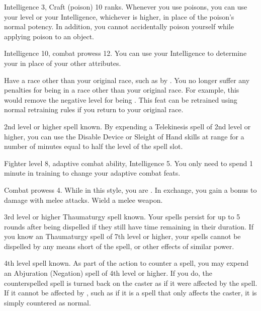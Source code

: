 \featpres Intelligence 3, Craft (poison) 10 ranks.
\featben Whenever you use poisons, you can use your level or your Intelligence, whichever is higher, in place of the poison's normal potency.
In addition, you cannot accidentally poison yourself while applying poison to an object.

\featpres Intelligence 10, combat prowess 12.
\featben You can use your Intelligence to determine your  in place of your other attributes.

\label{Racial Acclimation}
\featpres Have a race other than your original race, such as by .
\featben You no longer suffer any penalties for being in a race other than your original race.
For example, this would remove the negative level for being .
This feat can be retrained using normal retraining rules if you return to your original race.

\featpre 2nd level or higher  spell known.
\featben By expending a Telekinesis spell of 2nd level or higher, you can use the Disable Device or Sleight of Hand skills at \rngclose range for a number of minutes equal to half the level of the spell slot.

\featpres Fighter level 8, adaptive combat ability, Intelligence 5.
\featben You only need to spend 1 minute in training to change your adaptive combat feats.

\featpre Combat prowess 4.
\featben While in this style, you are .
In exchange, you gain a  bonus to damage with melee attacks.
\stylereq Wield a melee weapon.

\featpre 3rd level or higher Thaumaturgy spell known.
\featben Your spells persist for up to 5 rounds after being dispelled if they still have time remaining in their duration.
If you know an Thaumaturgy spell of 7th level or higher, your spells cannot be dispelled by any means short of the  spell, or other effects of similar power.

\featpre 4th level spell known.
\featben As part of the action to counter a spell, you may expend an Abjuration (Negation) spell of 4th level or higher.
If you do, the counterspelled spell is turned back on the caster as if it were affected by the 
spell.
If it cannot be affected by , such as if it is a spell that only affects the caster, it is simply countered as normal.

